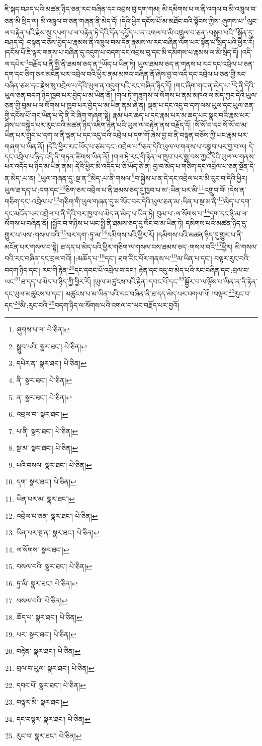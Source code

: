 ཇི་སྐད་བཤད་པའི་མཚན་ཉིད་ཅན་རང་བཞིན་དང་འབྲས་བུ་དག་གམ། མི་དམིགས་པ་ལ་ནི་འགལ་བ་མི་འཁྲུལ་བ་ཅན་མི་སྲིད་ལ། མི་འཁྲུལ་བ་ཅན་གཞན་ནི་མེད་དོ། །དེའི་ཕྱིར་དངོས་པོ་མ་མཐོང་བའི་སྟོབས་ཀྱིས་:ཞུགས་པ་\footnote{ཞུགས་པ་ལ་  པེ་ཅིན། }ལུང་ལ་བརྟེན་པའི་རྗེས་སུ་དཔག་པ་ལ་བརྟེན་ཏེ་དེའི་དོན་དཔྱོད་པ་ན་འགལ་བ་མི་འཁྲུལ་བ་ཅན་:བསྒྲུབ་པའི་\footnote{སྒྲུབ་པའི་  སྣར་ཐང་།  པེ་ཅིན། }སྐྱོན་དུ་བཤད་དེ། བསྟན་བཅོས་བྱེད་པ་རྣམས་ནི་འཁྲུལ་བས་དོན་རྣམས་ལ་རང་བཞིན་ལོག་པར་སྟོན་པ་སྲིད་པའི་ཕྱིར་རོ། །དངོས་པོ་ཇི་ལྟར་གནས་པ་བཞིན་དུ་འདུག་པ་བདག་དང་འབྲས་བུ་དང་མི་དམིགས་པ་རྣམས་ལ་མི་སྲིད་དོ། །འདི་ལ་དཔེར་\footnote{དཔེར་ན་  སྣར་ཐང་།  པེ་ཅིན། }བརྗོད་པ་ནི་སྤྱི་ནི་ཐམས་ཅད་ན་\footnote{ནི་  སྣར་ཐང་།  པེ་ཅིན། }ཡོད་པ་ཡིན་ཏེ། ཡུལ་ཐམས་ཅད་ན་གནས་པ་རང་དང་འབྲེལ་པ་ཅན་དག་དང་ཅིག་ཅར་མངོན་པར་འབྲེལ་བའི་ཕྱིར་ནམ་མཁའ་བཞིན་ནོ་ཞེས་བྱ་བ་འདི་དང་འབྲེལ་པ་ཅན་གྱི་རང་བཞིན་ཙམ་དང་རྗེས་སུ་འབྲེལ་པ་དེའི་ཡུལ་ན་འདུག་པའི་རང་བཞིན་ཉིད་དོ། །གང་ཞིག་གང་ན་མེད་པ་\footnote{ན་  སྣར་ཐང་།  པེ་ཅིན། }དེ་ནི་དེའི་ཡུལ་ཅན་བདག་ཉིད་ཁྱབ་པར་བྱེད་པ་མ་ཡིན་ནོ། །གལ་ཏེ་གཟུགས་ལ་སོགས་པ་ནམ་མཁའ་ལ་མེད་ཀྱང་དེའི་ཡུལ་ཅན་གྱི་བུམ་པ་ལ་སོགས་པ་ཁྱབ་པར་བྱེད་པ་མ་ཡིན་ནམ་ཞེ་ན། ལྡན་པ་དང་འདུ་བ་དག་ལས་ཡུལ་དང་ཡུལ་ཅན་གྱི་དངོས་པོ་གང་ཡིན་པ་དེ་ནི་རེ་ཞིག་གཞག་སྟེ། རྣམ་པར་ཆད་པ་དང་རྣམ་པར་མ་ཆད་པར་སྣང་བའི་རྣམ་པར་ཤེས་པ་བསྐྱེད་པར་རུང་བའི་མཚན་ཉིད་འཇིག་རྟེན་པའི་ཡུལ་ལ་བརྟེན་ནས་བརྗོད་དོ། །སོ་སོ་བ་དང་སོ་སོ་བ་མ་ཡིན་པར་གྲུབ་པ་དག་ལ་ནི་ལྡན་པ་དང་འདུ་བའི་འབྲེལ་པ་དག་གོ་ཞེས་བྱ་བ་ནི་བསྟན་བཅོས་ཀྱི་ཡང་རྣམ་པར་གཞག་པ་ཡིན་ནོ། །དེའི་ཕྱིར་རང་ཡོད་པ་ཙམ་དང་:འབྲེལ་པ་\footnote{འབྲལ་བ་  སྣར་ཐང་། }ཅན་དེའི་ཡུལ་ལ་གནས་པ་བསྒྲུབ་པར་བྱ་བ་ལ། དེ་དང་འབྲེལ་པ་ཉིད་འདི་ནི་གཏན་ཚིགས་ཡིན་ནོ། །གལ་ཏེ་རང་གི་རྟེན་ལ་ཁྱབ་པར་སྨྲ་བས་ཀྱང་དེའི་ཡུལ་ལ་གནས་པར་འདོད་པ་ཉིད་མ་ཡིན་ནམ། དེའི་ཕྱིར་མི་འདོད་པ་ཅི་ཡོད་ཅེ་ན། བྱ་བ་མེད་པ་གཅིག་དང་འབྲེལ་པ་ཅན་སྔོན་དེ་ན་མེད་:པ་ན། \footnote{པ་ནི་  སྣར་ཐང་།  པེ་ཅིན། }ཡུལ་གཞན་དུ་:སྔ་ན་\footnote{སྔ་མ་  སྣར་ཐང་།  པེ་ཅིན། }མེད་:པ་ནི་གསལ་\footnote{པའི་བསལ་  སྣར་ཐང་།  པེ་ཅིན། }བ་སྐྱེས་པ་ན་དེ་དང་འབྲེལ་པར་མི་རུང་བ་དེའི་ཕྱིར། ཡུལ་ཐ་དད་པ་:དག་དང་\footnote{དག་  སྣར་ཐང་།  པེ་ཅིན། }ཅིག་ཅར་འབྲེལ་པ་ནི་ཐམས་ཅད་དུ་ཁྱབ་པ་མ་:ཡིན་པར་མི་\footnote{ཡིན་པར་མ་  སྣར་ཐང་། }འགྲུབ་བོ། །དེས་ན་གཅིག་དང་:འབྲེལ་པ་\footnote{འབྲེལ་པ་ཅན་  སྣར་ཐང་།  པེ་ཅིན། }གཅིག་གི་ཡུལ་གཞན་དུ་མ་སོང་བར་དེའི་ཡུལ་ཅན་མ་:ཡིན་པ་སྔ་མ་ནི་\footnote{ཡིན་པར་སྔ་ན་  སྣར་ཐང་།  པེ་ཅིན། }མེད་པ་དག་དང་མངོན་པར་འབྲེལ་པ་ནི་དེའི་བར་ཁྱབ་པ་མེད་ན་མེད་པ་ཡིན་ཏེ། བུམ་པ་:ལ་སོགས་པ་\footnote{ལ་སོགས་  སྣར་ཐང་། }དག་དང་ཉི་མ་ལ་སོགས་པ་བཞིན་ནོ། །སྦྱོར་བ་གཉིས་པ་ཡང་སྤྱི་ནི་ཐམས་ཅད་དུ་སོང་བ་མ་ཡིན་ཏེ། དམིགས་པའི་མཚན་ཉིད་དུ་གྱུར་པ་ལས་:གསལ་བའི་\footnote{བསལ་བའི་  སྣར་ཐང་།  པེ་ཅིན། }བར་དག་:ཏུ་མ་\footnote{ཏུ་མི་  སྣར་ཐང་།  པེ་ཅིན། }དམིགས་པའི་ཕྱིར་རོ། །དམིགས་པའི་མཚན་ཉིད་དུ་གྱུར་པ་ནི་མངོན་པར་གསལ་བ་སྟེ། ཐ་དད་པ་མེད་པའི་ཕྱིར་གཅིག་ལ་གསལ་བས་ཐམས་ཅད་:གསལ་བའི་\footnote{བསལ་བའི་  པེ་ཅིན། }ཕྱིར། མི་གསལ་བའི་རང་བཞིན་དང་བྲལ་བའོ། །:མཆོད་པ་\footnote{ཆོད་པ་  སྣར་ཐང་།  པེ་ཅིན། }དང་། ཐག་རིང་པོར་གནས་པ་\footnote{པར་  སྣར་ཐང་།  པེ་ཅིན། }མ་ཡིན་པ་དང་། བལྟར་རུང་བའི་བདག་ཉིད་དང་། རང་གི་རྟེན་\footnote{བརྟེན་  སྣར་ཐང་།  པེ་ཅིན། }དང་དབང་པོ་འབྲེལ་བ་དང་། རྟེན་དང་འདུ་བ་མེད་པའི་རང་བཞིན་དང་:བྲལ་བ་ཡང་\footnote{བྲལ་བ་ཡུལ་  སྣར་ཐང་།  པེ་ཅིན། }ཐ་དད་པ་མེད་པ་ཉིད་ཀྱི་ཕྱིར་རོ། །ཡུལ་མཚུངས་པའི་རྟེན་:དབང་པོ་དང་\footnote{དབང་པོ་  སྣར་ཐང་།  པེ་ཅིན། }སྦྱོར་བ་ལ་ལྟོས་པ་ཡིན་ན་ནི་རྟེན་དང་ཡུལ་མཚུངས་པ་དང་། མཚུངས་པ་མ་ཡིན་པའི་རང་བཞིན་ནི་ཐ་དད་མེད་པར་འགལ་ལོ། །བལྟར་\footnote{བལྟར་མི་  སྣར་ཐང་། }རུང་བ་དང་\footnote{དང་བལྟར་  སྣར་ཐང་།  པེ་ཅིན། }མི་:རུང་བའི་\footnote{རུང་བ་  སྣར་ཐང་།  པེ་ཅིན། }བདག་ཉིད་ལ་སོགས་པའི་འགལ་བ་ཡང་བརྗོད་པར་བྱའོ། 